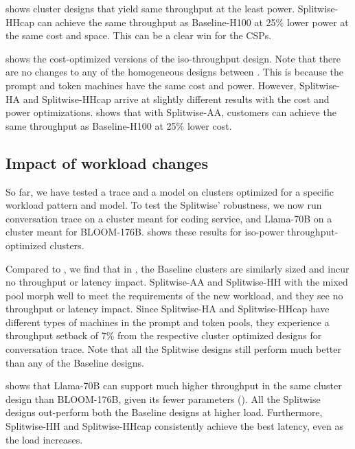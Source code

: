  shows cluster designs that yield same throughput at the least power.
Splitwise-HHcap can achieve the same throughput as Baseline-H100 at 25\% lower power at the same cost and space.
This can be a clear win for the CSPs.

 shows the cost-optimized versions of the iso-throughput design.
Note that there are no changes to any of the homogeneous designs between .
This is because the prompt and token machines have the same cost and power.
However, Splitwise-HA and Splitwise-HHcap arrive at slightly different results with the cost and power optimizations.
 shows that with Splitwise-AA, customers can achieve the same throughput as Baseline-H100 at 25\% lower cost.


\subsection{Impact of workload changes}
\label{subsec:exp-workload-changes}
So far, we have tested a trace and a model on clusters optimized for a specific workload pattern and model.
To test the Splitwise' robustness, we now run conversation trace on a cluster meant for coding service, and Llama-70B on a cluster meant for BLOOM-176B.
 shows these results for iso-power throughput-optimized clusters.

Compared to , we find that in , the Baseline clusters are similarly sized and incur no throughput or latency impact.
Splitwise-AA and Splitwise-HH with the mixed pool morph well to meet the requirements of the new workload, and they see no throughput or latency impact.
Since Splitwise-HA and Splitwise-HHcap have different types of machines in the prompt and token pools, they experience a throughput setback of 7\% from the respective cluster optimized designs for conversation trace. Note that all the Splitwise designs still perform much better than any of the Baseline designs. 

 shows that Llama-70B can support much higher throughput in the same cluster design than BLOOM-176B, given its fewer parameters ().
All the Splitwise designs out-perform both the Baseline designs at higher load.
Furthermore, Splitwise-HH and Splitwise-HHcap consistently achieve the best latency, even as the load increases.

